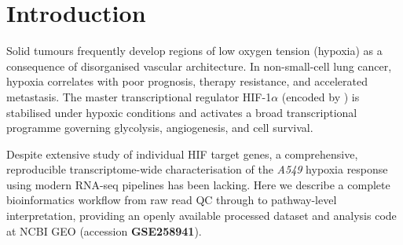 \section{Introduction}

Solid tumours frequently develop regions of low oxygen tension (hypoxia) as a consequence
of disorganised vascular architecture. In non-small-cell lung cancer,
hypoxia correlates with poor prognosis, therapy resistance, and accelerated metastasis.
The master transcriptional regulator HIF-1$\alpha$ (encoded by ) is
stabilised under hypoxic conditions and activates a broad transcriptional programme
governing glycolysis, angiogenesis, and cell survival.

Despite extensive study of individual HIF target genes, a comprehensive, reproducible
transcriptome-wide characterisation of the \textit{A549} hypoxia response using modern
RNA-seq pipelines has been lacking. Here we describe a complete bioinformatics workflow
from raw read QC through to pathway-level interpretation, providing an openly available
processed dataset and analysis code at NCBI GEO (accession \textbf{GSE258941}).

